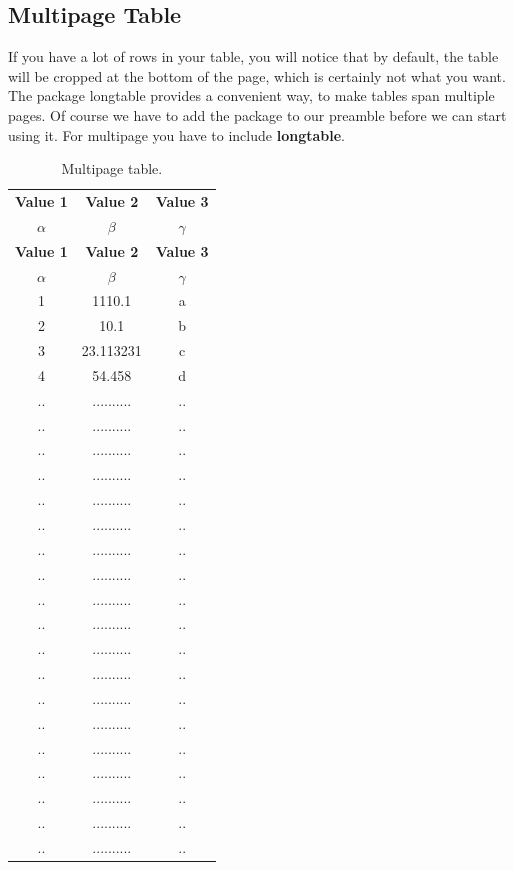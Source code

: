 \documentclass{article}
\begin{document}
\subsection{Multipage Table}
If you have a lot of rows in your table, you will notice that by default, the table will be cropped at the bottom of the page, which is certainly not what you want. The package longtable provides a convenient way, to make tables span multiple pages. Of course we have to add the package to our preamble before we can start using it. For multipage you have to include  \textbf{longtable}.

\begin{longtable}{c|c|c}
  \caption{Multipage table.}
  \label{tab:table1}\\
  \toprule
  \textbf{Value 1} & \textbf{Value 2} & \textbf{Value 3}\\
  $\alpha$ & $\beta$ & $\gamma$ \\
  \midrule
  \endfirsthead
  \toprule
  \textbf{Value 1} & \textbf{Value 2} & \textbf{Value 3}\\
  $\alpha$ & $\beta$ & $\gamma$ \\
  \midrule
  \endhead
  1 & 1110.1    & a\\
  2 & 10.1      & b\\
  3 & 23.113231 & c\\
  4 & 54.458    & d\\
  ..& ..........&..\\
  ..& ..........&..\\
  ..& ..........&..\\
  ..& ..........&..\\
  ..& ..........&..\\
  ..& ..........&..\\
  ..& ..........&..\\
  ..& ..........&..\\
  ..& ..........&..\\
  ..& ..........&..\\
  ..& ..........&..\\
  ..& ..........&..\\
  ..& ..........&..\\
  ..& ..........&..\\
  ..& ..........&..\\
  ..& ..........&..\\
  ..& ..........&..\\
  ..& ..........&..\\
  ..& ..........&..\\

\end{longtable}
\end{document}
